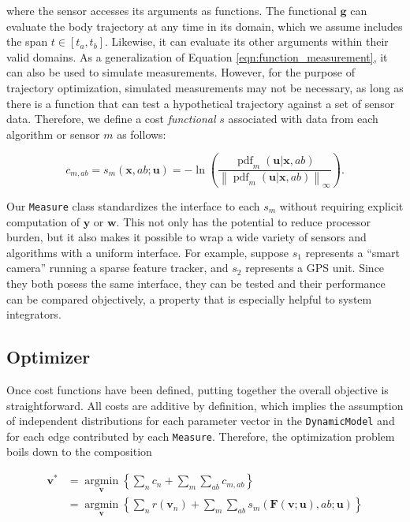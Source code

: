 \noindent where the sensor accesses its arguments as functions. The functional $\mathbf{g}$ can evaluate the body trajectory at any time in its domain, which we assume includes the span $t\in\left[t_a,t_b\right]$. Likewise, it can evaluate its other arguments within their valid domains. As a generalization of Equation \ref{eqn:function_measurement}, it can also be used to simulate measurements. However, for the purpose of trajectory optimization, simulated measurements may not be necessary, as long as there is a function that can test a hypothetical trajectory against a set of sensor data. Therefore, we define a cost \emph{functional} $s$ associated with data from each algorithm or sensor $m$ as follows:

\begin{equation}
c_{m,ab} = s_m\left(\mathbf{x},ab;\mathbf{u}\right) = -\operatorname{ln}\left(\frac{\operatorname{pdf}_m\left(\mathbf{u}|\mathbf{x},ab\right)}{\left\|{\operatorname{pdf}_m\left( \mathbf{u} |\mathbf{x},ab\right)}\right\|_\infty}\right).
\end{equation}

Our \texttt{\small{Measure}} class standardizes the interface to each $s_m$ without requiring explicit computation of $\mathbf{y}$ or $\mathbf{w}$. This not only has the potential to reduce processor burden, but it also makes it possible to wrap a wide variety of sensors and algorithms with a uniform interface. For example, suppose $s_1$ represents a ``smart camera'' running a sparse feature tracker, and $s_2$ represents a GPS unit. Since they both posess the same interface, they can be tested and their performance can be compared objectively, a property that is especially helpful to system integrators.

\subsection{Optimizer}\label{sec:optimizer}
Once cost functions have been defined, putting together the overall objective is straightforward. All costs are additive by definition, which implies the assumption of independent distributions for each parameter vector in the \texttt{\small{DynamicModel}} and for each edge contributed by each \texttt{\small{Measure}}. Therefore, the optimization problem boils down to the composition

\begin{align}\label{eqn:objective}
{\mathbf{v}}^ * &= \mathop {\operatorname{argmin} }\limits_{\mathbf{v}} \left\lbrace \sum\limits_n {c_n }  + \sum\limits_m {\sum\limits_{ab} {c_{m,ab} } } \right\rbrace \\
 \nonumber &= \mathop { \operatorname{argmin} }\limits_{\mathbf{v}} \left\lbrace \sum\limits_n {r\left( {{\mathbf{v}}_n } \right)}  + \sum\limits_m {\sum\limits_{ab} {s_m \left( {{\mathbf{F}}\left( {{\mathbf{v}};{\mathbf{u}}} \right),ab;{\mathbf{u}}} \right)} } \right\rbrace
\end{align}

